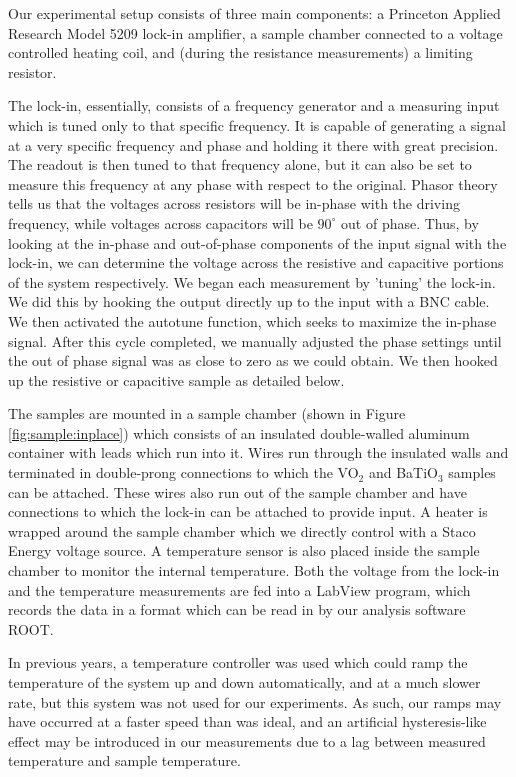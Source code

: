 \documentclass[%
 reprint,
 amsmath,amssymb,
 aps,
 pra,
]{revtex4-1}
\begin{document}
Our experimental setup consists of three main components: a Princeton Applied Research Model 5209 lock-in amplifier, a sample chamber connected to a voltage controlled heating coil, and (during the resistance measurements) a limiting resistor. 

The lock-in, essentially, consists of a frequency generator and a measuring input which is tuned only to that specific frequency. It is capable of generating a signal at a very specific frequency and phase and holding it there with great precision. The readout is then tuned to that frequency alone, but it can also be set to measure this frequency at any phase with respect to the original. Phasor theory tells us that the voltages across resistors  will be in-phase with the driving frequency, while voltages across capacitors will be $90^\circ$ out of phase. Thus, by looking at the in-phase and out-of-phase components of the input signal with the lock-in, we can determine the voltage across the resistive and capacitive portions of the system respectively. We began each measurement by 'tuning' the lock-in. We did this by hooking the output directly up to the input with a BNC cable. We then activated the autotune function, which seeks to maximize the in-phase signal. After this cycle completed, we manually adjusted the phase settings until the out of phase signal was as close to zero as we could obtain. We then hooked up the resistive or capacitive sample as detailed below.

The samples are mounted in a sample chamber (shown in Figure \ref{fig:sample:inplace}) which consists of an insulated double-walled aluminum container with leads which run into it. Wires run through the insulated walls and terminated in double-prong connections to which the VO$_2$ and BaTiO$_3$ samples can be attached. These wires also run out of the sample chamber and have connections to which the lock-in can be attached to provide input. A heater is wrapped around the sample chamber which we directly control with a Staco Energy voltage source. A temperature sensor is also placed inside the sample chamber to monitor the internal temperature. Both the voltage from the lock-in and the temperature measurements are fed into a LabView program, which records the data in a format which can be read in by our analysis software ROOT.

In previous years, a temperature controller was used which could ramp the temperature of the system up and down automatically, and at a much slower rate, but this system was not used for our experiments. As such, our ramps may have occurred at a faster speed than was ideal, and an artificial hysteresis-like effect may be introduced in our measurements due to a lag between measured temperature and sample temperature. 
\end{document}
